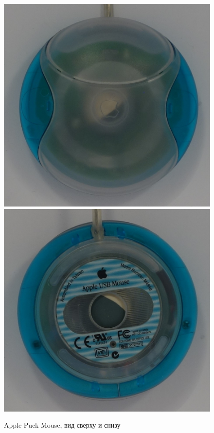 \documentclass[11pt, a4paper]{article}
\begin{document}
\begin{figure}[h]
    \centering
    \includegraphics[scale=0.5]{1998_apple_puck/appleup.JPG}
    \includegraphics[scale=0.5]{1998_apple_puck/appledown.JPG}
    \caption{Apple Puck Mouse, вид сверху и снизу}
    \label{fig:top}
\end{figure}
\end{document}
